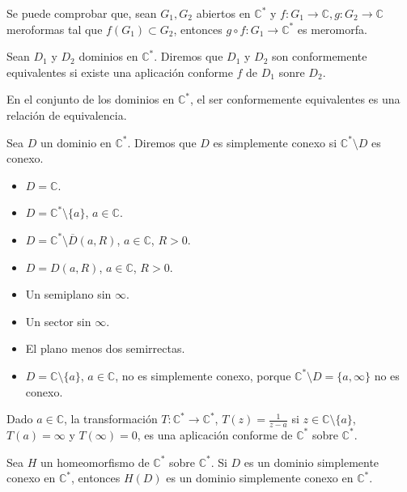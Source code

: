 Se puede comprobar que, sean $G_1, G_2$ abiertos en $\mathbb{C}^\ast$ y $f: G_1 \to \mathbb{C}, g: G_2 \to \mathbb{C}$ meroformas tal que $f(G_1) \subset G_2$, entonces $g \circ f: G_1 \to \mathbb{C}^\ast$ es meromorfa.

\begin{definition}
    Sean $D_1$ y $D_2$ dominios en $\mathbb{C}^\ast$.
    Diremos que $D_1$ y $D_2$ son conformemente equivalentes si existe una aplicación conforme $f$ de $D_1$ sonre $D_2$.

    En el conjunto de los dominios en $\mathbb{C}^\ast$, el ser conformemente equivalentes es una relación de equivalencia.
\end{definition}

\begin{definition}
    Sea $D$ un dominio en $\mathbb{C}^\ast$.
    Diremos que $D$ es simplemente conexo si $\mathbb{C}^\ast \setminus D$ es conexo.
\end{definition}

\begin{example}
    \hfill
    \begin{itemize}
        \item $D = \mathbb{C}$.
        \item $D = \mathbb{C}^\ast \setminus \{a\}$, $a \in \mathbb{C}$.
        \item $D = \mathbb{C}^\ast \setminus \overline{D}(a, R)$, $a \in \mathbb{C}$, $R > 0$.
        \item $D = D(a, R)$, $a \in \mathbb{C}$, $R > 0$.
        \item Un semiplano sin $\infty$.
        \item Un sector sin $\infty$.
        \item El plano menos dos semirrectas.
        \item $D = \mathbb{C} \setminus \{a\}$, $a \in \mathbb{C}$, no es simplemente conexo, porque $\mathbb{C}^\ast \setminus D = \{a, \infty\}$ no es conexo.
    \end{itemize}
\end{example}

\begin{lemma}
    Dado $a \in \mathbb{C}$, la transformación $T: \mathbb{C}^\ast \to \mathbb{C}^\ast$, $T(z) = \frac{1}{z-a}$ si $z \in \mathbb{C} \setminus \{a\}$, $T(a) = \infty$ y $T(\infty) = 0$, es una aplicación conforme de $\mathbb{C}^\ast$ sobre $\mathbb{C}^\ast$.
\end{lemma}

\begin{lemma}
    Sea $H$ un homeomorfismo de $\mathbb{C}^\ast$ sobre $\mathbb{C}^\ast$.
    Si $D$ es un dominio simplemente conexo en $\mathbb{C}^\ast$, entonces $H(D)$ es un dominio simplemente conexo en $\mathbb{C}^\ast$.
\end{lemma}

